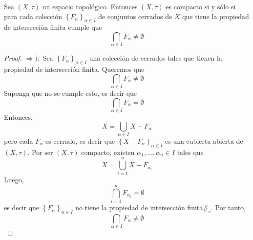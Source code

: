 \documentclass[12pt]{report}
\theoremstyle{largebreak}
\newcommand\contradiction{\ensuremath{\#_c}}
\begin{document}
    \begin{propo}
        Sea $(X,\tau)$ un espacio topológico. Entonces $(X,\tau)$ es compacto si y sólo si para cada colección $\left\{F_\alpha \right\}_{\alpha\in I}$ de conjuntos cerrados de $X$ que tiene la propiedad de intersección finita cumple que
        \begin{equation*}
            \bigcap_{ \alpha\in I}F_\alpha\neq\emptyset
        \end{equation*}
    \end{propo}

    \begin{proof}
        $\Rightarrow):$ Sea $\left\{F_\alpha \right\}_{\alpha\in I}$ una colección de cerrados tales que tienen la propiedad de intersección finita. Queremos que
        \begin{equation*}
            \bigcap_{\alpha\in I}F_\alpha\neq\emptyset
        \end{equation*}
        Suponga que no se cumple esto, es decir que
        \begin{equation*}
            \bigcap_{\alpha\in I}F_\alpha=\emptyset
        \end{equation*}
        Entonces,
        \begin{equation*}
            X=\bigcup_{\alpha\in I}X-F_\alpha
        \end{equation*}
        pero cada $F_\alpha$ es cerrado, es decir que $\left\{X-F_\alpha \right\}_{\alpha\in I}$ es una cubierta abierta de $(X,\tau)$. Por ser $(X,\tau)$ compacto, existen $\alpha_1,...,\alpha_n\in I$ tales que
        \begin{equation*}
            X=\bigcup_{ i=1}^n X-F_{\alpha_i}
        \end{equation*}
        Luego,
        \begin{equation*}
            \bigcap_{ i=1}^n F_{\alpha_i}=\emptyset
        \end{equation*}
        es decir que $\left\{F_\alpha\right\}_{\alpha\in I}$ no tiene la propiedad de intersección finita\contradiction. Por tanto,
        \begin{equation*}
            \bigcap_{\alpha\in I}F_\alpha\neq\emptyset
        \end{equation*}


\end{proof}
\end{document}
